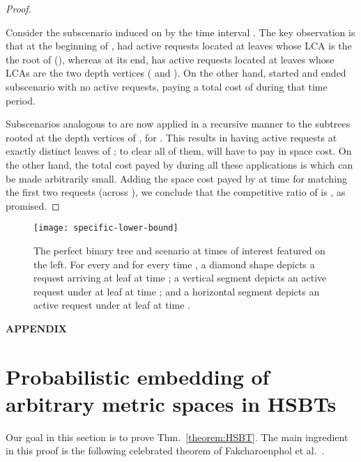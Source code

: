 \documentclass[11pt]{article}
\def\LongVersion{}
\def\LongVersionEnd{}
\theoremstyle{definition}
\theoremstyle{plain}
\theoremstyle{definition}
\theoremstyle{plain}
\theoremstyle{definition}
\theoremstyle{plain}
\newenvironment{DenseItemize}[0]
{\begin{list}{\labelitemi}{\usecounter{enumi}
\itemsep 0pt \parsep 0pt \leftmargin 5mm \labelwidth 5mm \parskip 0pt \topsep
0pt}}
{\end{list}}
\newcommand{\Thm}{Thm.}
\begin{document}
\begin{proof}
\begin{DenseItemize}
\end{DenseItemize}

Consider the subscenario  induced on  by the time interval
.
The key observation is that at the beginning of ,  had
 active requests located at leaves whose LCA is the the root of 
(), whereas at its end,  has  active requests located at leaves
whose LCAs are the two depth  vertices ( and ).
On the other hand,  started and ended subscenario  with
no active requests, paying a total cost of  during that time
period.

Subscenarios analogous to  are now applied in a recursive manner to
the subtrees rooted at the depth  vertices of , for
.
This results in  having active requests at exactly  distinct
leaves of ;
to clear all of them,  will have to pay  in space cost.
On the other hand, the total cost payed by  during all these
applications is  which can be made arbitrarily small.
Adding the  space cost payed by  at time  for matching
the first two requests (across ), we conclude that the competitive
ratio of  is , as promised.
\end{proof}

\def\FigureSpecificLowerBound{
\begin{figure}
\begin{center}
\texttt{[image: specific-lower-bound]}
\end{center}
\caption{ \label{figure:specific-lower-bound}
The perfect binary tree  and scenario  at times of interest
featured on the left.
For every  and for every time ,
a diamond shape depicts a request arriving at leaf  at time ;
a vertical segment depicts an active request under  at leaf  at
time ; and
a horizontal segment depicts an active request under  at leaf
 at time .
}
\end{figure}
}
\FigureSpecificLowerBound{}

\LongVersionEnd 

\clearpage
\renewcommand{\thepage}{}




\LongVersion \clearpage
{}
\appendix

\renewcommand{\theequation}{A-\arabic{equation}}
\setcounter{equation}{0}

\begin{center}
\textbf{\large{APPENDIX}}
\end{center}

\section{Probabilistic embedding of arbitrary metric spaces in HSBTs}
\label{appendix:embedding-in-HSBT}
Our goal in this section is to prove \Thm{}~\ref{theorem:HSBT}.
The main ingredient in this proof is the following celebrated theorem of
Fakcharoenphol et al.~\cite{FakcharoenpholRT2004}.
\end{document}
